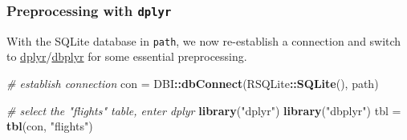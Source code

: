 \documentclass[]{article}
\newenvironment{Shaded}{\begin{snugshade}}{\end{snugshade}}
\newcommand{\CommentTok}[1]{\textcolor[rgb]{0.56,0.35,0.01}{\textit{#1}}}
\newcommand{\DataTypeTok}[1]{\textcolor[rgb]{0.13,0.29,0.53}{#1}}
\newcommand{\DecValTok}[1]{\textcolor[rgb]{0.00,0.00,0.81}{#1}}
\newcommand{\KeywordTok}[1]{\textcolor[rgb]{0.13,0.29,0.53}{\textbf{#1}}}
\newcommand{\NormalTok}[1]{#1}
\newcommand{\OperatorTok}[1]{\textcolor[rgb]{0.81,0.36,0.00}{\textbf{#1}}}
\newcommand{\StringTok}[1]{\textcolor[rgb]{0.31,0.60,0.02}{#1}}
\renewenvironment{Shaded} {\begin{snugshade}\small} {\end{snugshade}}
\begin{document}
\begin{Shaded}
\end{Shaded}

\hypertarget{preprocessing-with-dplyr}{%
\subsubsection{\texorpdfstring{Preprocessing with \texttt{dplyr}}{Preprocessing with dplyr}}\label{preprocessing-with-dplyr}}

With the SQLite database in \texttt{path}, we now re-establish a connection and switch to \href{https://cran.r-project.org/package=dplyr}{dplyr}/\href{https://cran.r-project.org/package=dbplyr}{dbplyr} for some essential preprocessing.

\begin{Shaded}
\begin{Highlighting}[]
\CommentTok{# establish connection}
\NormalTok{con =}\StringTok{ }\NormalTok{DBI}\OperatorTok{::}\KeywordTok{dbConnect}\NormalTok{(RSQLite}\OperatorTok{::}\KeywordTok{SQLite}\NormalTok{(), path)}

\CommentTok{# select the "flights" table, enter dplyr}
\KeywordTok{library}\NormalTok{(}\StringTok{"dplyr"}\NormalTok{)}
\KeywordTok{library}\NormalTok{(}\StringTok{"dbplyr"}\NormalTok{)}
\NormalTok{tbl =}\StringTok{ }\KeywordTok{tbl}\NormalTok{(con, }\StringTok{"flights"}\NormalTok{)}
\end{Highlighting}
\end{Shaded}
\end{document}
